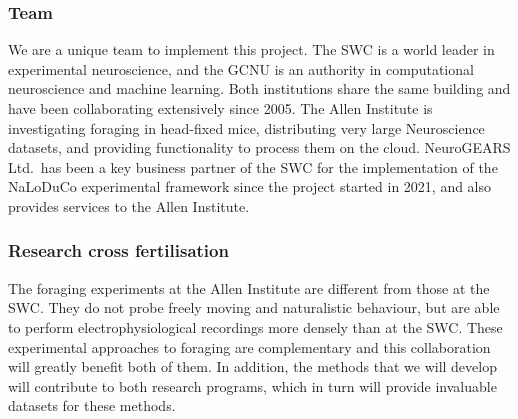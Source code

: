\subsubsection{Team}

We are a unique team to implement this project.
%
The SWC is a world leader in experimental neuroscience, and the GCNU is an
authority in computational neuroscience and machine learning. Both institutions
share the same building and have been collaborating extensively since 2005.
%
The Allen Institute is investigating
foraging in head-fixed mice, distributing very large Neuroscience datasets,
and providing functionality to process them on the cloud.
%
NeuroGEARS Ltd.\ has been a key business partner of the SWC for the
implementation of the NaLoDuCo experimental framework since the project started
in 2021, and also provides services to the Allen Institute.

\subsubsection{Research cross fertilisation}

The foraging experiments at the Allen Institute are different from those at
the SWC. They do not probe freely moving and naturalistic behaviour, but are
able to perform electrophysiological recordings more densely than at the SWC.
%
These experimental approaches to foraging are complementary and this
collaboration will greatly benefit both of them.
%
In addition, the methods that we will develop will contribute to both research
programs, which in turn will provide invaluable datasets for these methods.

